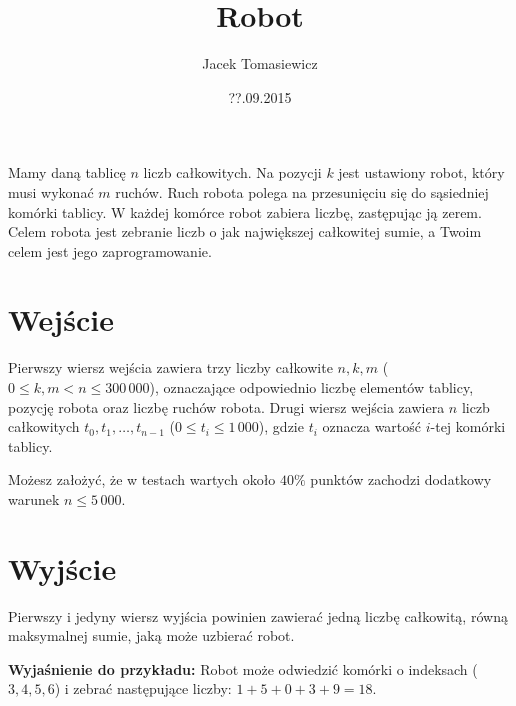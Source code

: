 \documentclass[zad,zawodnik,utf8]{sinol}
\title{Robot}
\author{Jacek Tomasiewicz} %
\date{??.09.2015}
\begin{document}
  \begin{tasktext}%
Mamy daną tablicę $n$ liczb całkowitych. Na pozycji $k$ jest ustawiony robot, który musi wykonać $m$ ruchów.
Ruch robota polega na przesunięciu się do sąsiedniej komórki tablicy.
W każdej komórce robot zabiera liczbę, zastępując ją zerem.
Celem robota jest zebranie liczb o jak największej całkowitej sumie, 
a Twoim celem jest jego zaprogramowanie.

  \section{Wejście}
Pierwszy wiersz wejścia zawiera trzy liczby całkowite $n, k, m$ ($0 \leq k, m < n \leq 300\,000$), 
oznaczające odpowiednio liczbę elementów tablicy, pozycję robota oraz liczbę ruchów robota. 
Drugi wiersz wejścia zawiera $n$ liczb całkowitych $t_0, t_1, \ldots, t_{n-1}$ ($0 \leq t_i \leq 1\,000$), 
gdzie $t_i$ oznacza wartość $i$-tej komórki tablicy.

Możesz założyć, że w testach wartych około $40\%$ punktów zachodzi dodatkowy warunek $n \leq 5\,000$.

  \section{Wyjście}

Pierwszy i jedyny wiersz wyjścia powinien zawierać jedną liczbę całkowitą, 
równą maksymalnej sumie, jaką może uzbierać robot.

     \makecompactexample    

	 \medskip
	 \noindent
	 \textbf{Wyjaśnienie do przykładu:} Robot może odwiedzić komórki o indeksach ($3, 4, 5, 6$) 
	 i zebrać następujące liczby: $1 + 5 + 0 + 3 + 9 = 18$.
	 
  \end{tasktext}
\end{document}
